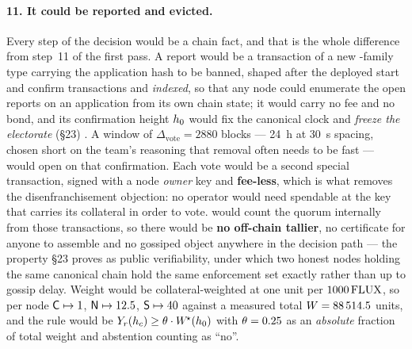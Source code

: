 \paragraph{11. It could be reported and evicted.}
Every step of the decision would be a chain fact, and that is the whole difference from step~11 of
the first pass. A report would be a \fluxd transaction of a new \FluxNode-family type carrying the
application hash to be banned, shaped after the deployed start and confirm transactions and
\emph{indexed}, so that any node could enumerate the open reports on an application from its own
chain state; it would carry no fee and no bond, and its confirmation height $h_0$ would fix the
canonical clock and \emph{freeze the electorate} (\S23)
. A window of
$\Delta_{\mathrm{vote}} = \num{2880}$ blocks --- \SI{24}{\hour} at \SI{30}{\second} spacing, chosen
short on the team's reasoning that removal often needs to be fast --- would open on that
confirmation. Each vote would be a second special transaction, signed with a node \emph{owner} key
and \textbf{fee-less}, which is what removes the disenfranchisement objection: no operator would need
spendable \flux at the key that carries its collateral in order to vote. \fluxd would count the
quorum internally from those transactions, so there would be \textbf{no off-chain tallier}, no
certificate for anyone to assemble and no gossiped object anywhere in the decision path --- the
property \S23 proves as public verifiability, under which two honest nodes holding the same canonical
chain hold the same enforcement set exactly rather than up to gossip delay. Weight would be
collateral-weighted at one unit per $\num{1000}\,\mathrm{FLUX}$, so per node $\mathsf{C} \mapsto 1$,
$\mathsf{N} \mapsto 12.5$, $\mathsf{S} \mapsto 40$ against a measured total $W = \num{88514.5}$ units, and
the rule would be $Y_r(h_c) \ge \theta \cdot W^{\!\star}(h_0)$ with $\theta = 0.25$
as an \emph{absolute} fraction of total weight and abstention counting as ``no''.


